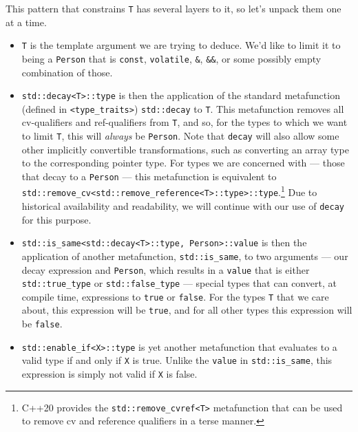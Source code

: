 \noindent This pattern that constrains \lstinline!T! has several layers to it,
so let's unpack them one at a time.
\begin{itemize}
\item{\lstinline!T! is the template argument we are trying to deduce. We’d like to limit it to being a \lstinline!Person! that is \lstinline!const!, \lstinline!volatile!, \lstinline!&!, \lstinline!&&!, or some possibly empty combination of those.}
\item{\lstinline!std::decay<T>::type! is then the application of the standard metafunction (defined in \lstinline!<type_traits>!) \lstinline!std::decay! to \lstinline!T!. This metafunction removes all cv-qualifiers and ref-qualifiers from \lstinline!T!, and so, for the types to which we want to limit \lstinline!T!, this will \emph{always} be \lstinline!Person!. Note that \lstinline!decay! will also allow some other implicitly convertible transformations, such as converting an array type to the corresponding pointer type. For types we are concerned with --- those that decay to a \lstinline!Person! --- this metafunction is equivalent to \lstinline!std::remove_cv<std::remove_reference<T>::type>::type!.\footnote{C++20 provides the  \lstinline!std::remove_cvref<T>! metafunction that can be used to remove cv and reference qualifiers in a terse manner.} Due to historical availability and readability, we will continue with our use of \lstinline!decay! for this purpose.}
\item{\lstinline!std::is_same<std::decay<T>::type,!~\lstinline!Person>::value! is then the application of another metafunction, \lstinline!std::is_same!, to two arguments --- our decay expression and \lstinline!Person!, which results in a \lstinline!value! that is either \lstinline!std::true_type! or \lstinline!std::false_type! --- special types that can convert, at compile time, expressions to \lstinline!true! or \lstinline!false!. For the types \lstinline!T! that we care about, this expression will be \lstinline!true!, and for all other types this expression will be \lstinline!false!.}
\item{\lstinline!std::enable_if<X>::type! is yet another metafunction that evaluates to a valid type if and only if \lstinline!X! is true. Unlike the \lstinline!value! in \lstinline!std::is_same!, this expression is simply not valid if \lstinline!X! is false.}

\end{itemize}
